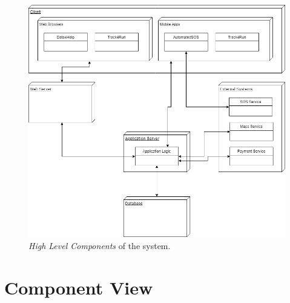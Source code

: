 \begin{figure}[H]
  \begin{center}
  	\includegraphics[width=\textwidth]{./img/HighLevelComponents.png}
    \hspace{0.05\linewidth}
    \centering
    \caption{\textit{High Level Components} of the system.}
		\label{img:highLevelComponents}
    \end{center}
\end{figure}
\section{Component View}

